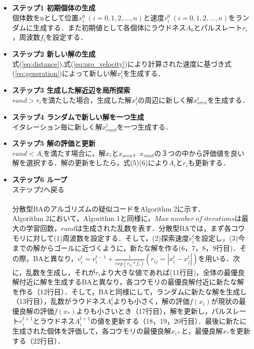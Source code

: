\documentclass{jarticle}
\begin{document}
\begin{itemize}
\item {\bf ステップ1 初期個体の生成} \\
個体数をnとして位置${x_i^0\ (i=0,1,2,...,n)}$と速度${v_i^0\ (i=0,1,2,...,n)}$をランダムに生成する．また初期値として各個体にラウドネス${A_0}$とパルスレート${r_i}$，周波数${f_i}$を設定する．
\item {\bf ステップ2 新しい解の生成} \\
式(\ref{eq:distance}),式(\ref{eq:pro_velocity})により計算された速度に基づき式(\ref{eq:generation})によって新しい解${x_i^t}$を生成する．
\item {\bf ステップ3 生成した解近辺を局所探索} \\
${rand>r_i}$を満たした場合，生成した解${x_i^t}$の周辺に新しく解${x_{area}^t}$を生成する． 
\item {\bf ステップ4 ランダムで新しい解を一つ生成} \\
イタレーション毎に新しく解${x_{rand}^t}$を一つ生成する． 
\item {\bf ステップ5 解の評価と更新} \\
${rand<A_i}$を満たす場合に，解${x_i}$と${x_{area}}$，${x_{rand}}$の３つの中から評価値を良い解を選択する．解の更新をしたら，式(5)(6)により${A_i}$と${r_i}$も更新する．
\item {\bf ステップ6 ループ} \\
ステップ2へ戻る \\
\\
分散型BAのアルゴリズムの疑似コードをAlgorithm 2に示す．　\\
Algorithm 2において，Algorithm 1と同様に，$Max\ number\ of\ iterations$は最大の学習回数，$rand$は生成された乱数を表す．分散型BAでは，まず各コウモリに対して(1)周波数を設定する．そして，(2)探索速度$v_i^t$を設定し，(3)今までの解からゴールに近づくように，新たな解を作る(6，7，8，9行目)．その際，BAと異なり，$v_i^t=v_i^{t-1}+\frac{1}{exp(r_{ij}*f_i)}(r_{ij}=|x_i^t-x_j^t|)$を用いる．次に，乱数を生成し，それが$r_i$より大きな値であれば(11行目)，全体の最優良解付近に解を生成するBAと異なり，各コウモリの最優良解付近に新たな解を作る（12行目）．そして，BAと同様にして，ランダムに新たな解を生成し（13行目），乱数がラウドネス$A_i^t$よりも小さく，解の評価$f(x_i)$が現状の最優良解の評価$f(x_*)$よりも小さいとき（17行目），解を更新し，パルスレート$r_i^{t+1}$とラウドネス$A_i^{t+1}$の値を更新する（18，19，20行目）．最後に新たに生成された個体を評価して，各コウモリの最優良解$x_{i*}$と，最優良解$x_*$を更新する（22行目）．\\
\end{itemize}
\end{document}
